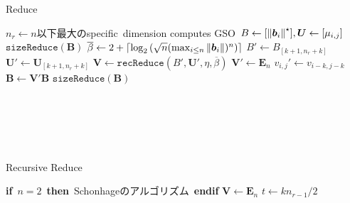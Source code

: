 \documentclass[12pt,aspectratio=169,table,dvipdfmx, leqno]{beamer}
\begin{document}
\begin{frame}
\begin{minipage}[b]{0.45\columnwidth}
\begin{algorithm}[H]
    \footnotesize
    \begin{algorithmic}[1]
        \caption{\footnotesize Reduce\cite{NS16}}
        \label{alg_REDUCE}
        \State $n_r\gets n$以下最大のspecific~dimension
        \State computes GSO~$B\gets[\norm{\bm{b}_i}^\star], \bm{U}\gets [\mu_{i, j}]$
        \State $\texttt{sizeReduce}(\bm{B})$
        \State $\overline{\beta}\gets 2+\lceil \log_2{(\sqrt{n}(\max_{i\le n}\norm{\bm{b}_i})^n)}\rceil$
                \State $B'\gets B_{[k+1, n_r+k]}$
                \State $\bm{U}'\gets \bm{U}_{[k+1, n_r+k]}$
                \State $\bm{V}\gets\texttt{recReduce}(B', \bm{U}', \eta, \overline{\beta})$
                \State $\bm{V}'\gets \bm{E}_n$
                    \State $v_{i, j}'\gets v_{i-k, j-k}$
                \EndFor
                \State $\bm{B}\gets \bm{V}'\bm{B}$
                \State $\texttt{sizeReduce}(\bm{B})$
            \EndFor
        \EndFor
    \end{algorithmic}
\end{algorithm}
\mbox{}\\
\mbox{}\\
\mbox{}\\
\mbox{}\\
\end{minipage}
\hspace{0.03\columnwidth} %
\begin{minipage}[b]{0.45\columnwidth}
\begin{algorithm}[H]
    \footnotesize
    \begin{algorithmic}[1]
        \caption{\footnotesize Recursive Reduce\cite{NS16}}
        \label{alg_L2_2}
        \State \textbf{if}~$n=2$~\textbf{then}~Schonhageのアルゴリズム\cite{Schonhage91}~\textbf{endif}
        \State $\bm{V}\gets \bm{E}_n$
                \State $t\gets kn_{r-1}/2$

\end{algorithmic}
\end{algorithm}
\end{minipage}
\end{frame}
\end{document}
